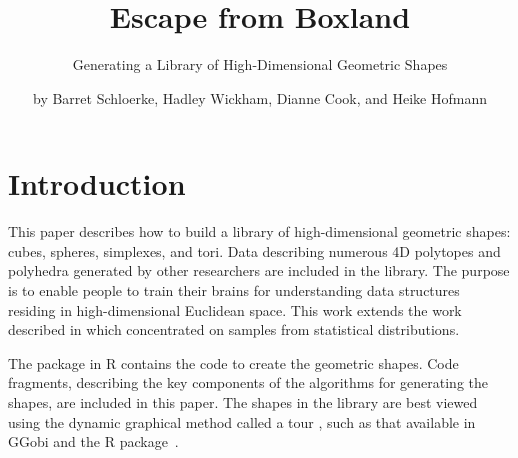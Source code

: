 \title{Escape from Boxland}
\subtitle{Generating a Library of High-Dimensional Geometric Shapes}
\author{by Barret Schloerke, Hadley Wickham, Dianne Cook, and Heike Hofmann}

\maketitle





\section{Introduction}

This paper describes how to build a library of high-dimensional
geometric shapes: cubes, spheres, simplexes, and tori. Data
describing numerous 4D polytopes and polyhedra generated by other
researchers are included in the library. The purpose is to enable
people to train their brains for understanding data structures residing in
high-dimensional Euclidean space. This work extends the work described
in \cite{Co97} which concentrated on samples from statistical
distributions.

 The  package in R \citep{R03} contains
the code to create the geometric shapes. Code fragments, describing
the key components of the algorithms for generating the shapes, are
included in this paper. The shapes in the library are best viewed using the dynamic graphical method called a tour \citep{AS85,BCAH05,ClBW07}, such as that available in GGobi
\citep{STLBC02} and the  R package~\citep{WCHB11}.

